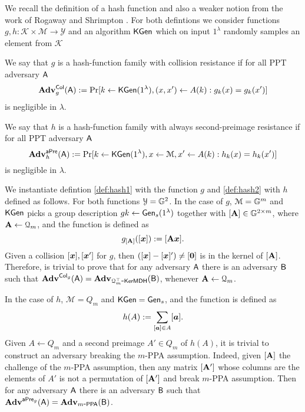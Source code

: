 We recall the definition of a hash function and also a weaker notion from the work of Rogaway and Shrimpton \cite{FSE:RogShr04}. For both defintions we consider functions $g,h:\mathcal{K}\times\mathcal{M}\to\mathcal{Y}$ and an algorithm $\mathsf{KGen}$ which on input $1^\lambda$ randomly samples an element from $\mathcal{K}$

\begin{definition}\label{def:hash1}
 We say that $g$ is a hash-function family with collision resistance if for all PPT adversary $\mathsf{A}$
$$
\mathbf{Adv}_g^{\mathsf{Col}}(\mathsf{A}) := \Pr[k\gets\mathsf{KGen}(1^\lambda), (x,x')\gets A(k):g_k(x)=g_k(x')]
$$ 
is negligible in $\lambda$.
\end{definition}

\begin{definition}\label{def:hash2}
 We say that $h$ is a hash-function family with always second-preimage resistance if for all PPT adversary $\mathsf{A}$
$$
\mathbf{Adv}_h^{\mathsf{aPre}}(\mathsf{A}) := \Pr[k\gets\mathsf{KGen}(1^\lambda), x\gets\mathcal{M}, x'\gets A(k):h_k(x)=h_k(x')]
$$ 
is negligible in $\lambda$.
\end{definition}

We instantiate defintion \ref{def:hash1} with the function $g$ and \ref{def:hash2}  with $h$ defined as follows. For both functions $\mathcal{Y}=\mathbb{G}^2$. In the case of $g$, $\mathcal{M}=\mathbb{G}^m$ and $\mathsf{KGen}$ picks a group description $gk\gets\mathsf{Gen}_s(1^\lambda)$ together with $[\mathbf{{A}}]\in\mathbb{G}^{2\times m}$, where $\mathbf{{A}}\gets\mathcal{Q}_m$, and the function is defined as
$$
g_{[\mathbf{{A}}]}([{\boldsymbol{x}}]):= [\mathbf{{A}}{\boldsymbol{x}}].
$$
Given a collision $[{\boldsymbol{x}}],[{\boldsymbol{x}}']$ for $g$, then $([{\boldsymbol{x}}]-[{\boldsymbol{x}}]')\neq [{\boldsymbol{0}}]$ is in the kernel of $[\mathbf{{A}} ]$. Therefore, is trivial to prove that for any adversary $\mathsf{A}$ there is an adversary $\mathsf{B}$ such that $\mathbf{Adv}^{\mathsf{Col}_g}(\mathsf{A})=\mathbf{Adv}_{\mathcal{Q}_m^\top\mbox{-}\mathsf{KerMDH}}(\mathsf{B})$, whenever $\mathbf{{A}}\gets\mathcal{Q}_m$.

 In the case of $h$, $\mathcal{M}=Q_m$ and $\mathsf{KGen}=\mathsf{Gen}_s$, and the function is defined as
$$
h(A):= \sum_{[{\boldsymbol{a}}]\in A}[{\boldsymbol{a}}].
$$
Given $A\gets Q_m$ and a second preimage $A'\in Q_m$ of $h(A)$, it is trivial to construct an adversary breaking the $m$-PPA assumption. Indeed, given $[\mathbf{{A}}]$ the challenge of the $m$-PPA assumption, then any matrix $[\mathbf{{A}}']$ whose columns are the elements of $A'$ is not a permutation of $[\mathbf{{A}}']$ and break $m$-PPA assumption. Then for any adversary $\mathsf{A}$ there is an adversary $\mathsf{B}$ such that $\mathbf{Adv}^{\mathsf{aPre}_g}(\mathsf{A})=\mathbf{Adv}_{m\mbox{-}\mathsf{PPA}}(\mathsf{B})$.

